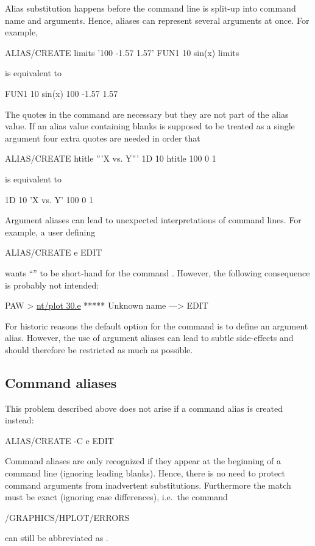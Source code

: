 Alias substitution happens before the command line is split-up into
command name and arguments.
Hence, aliases can represent several arguments at once.
For example,
\begin{XMP}
ALIAS/CREATE limits '100 -1.57 1.57'
FUN1 10 sin(x) limits
\end{XMP}
is equivalent to
\begin{XMP}
FUN1 10 sin(x) 100 -1.57 1.57
\end{XMP}
The quotes in the  command are necessary but they are
not part of the alias value.
If an alias value containing blanks is supposed to be treated as a
single argument four extra quotes are needed in order that
\begin{XMP}
ALIAS/CREATE htitle '''X vs. Y'''
1D 10 htitle 100 0 1
\end{XMP}
is equivalent to
\begin{XMP}
1D 10 'X vs. Y' 100 0 1
\end{XMP}

Argument aliases can lead to unexpected interpretations of command lines.
For example, a user defining
\begin{XMP}
ALIAS/CREATE e EDIT
\end{XMP}
wants ``'' to be short-hand for the command .
However, the following consequence is probably not intended:
\begin{XMP} 
PAW > \underline{nt/plot 30.e}
\vspace{-.8\baselineskip}
 ***** Unknown name ---> EDIT
\end{XMP}

For historic reasons the default option for the 
command is to define an argument alias.
However, the use of argument aliases can lead to subtle side-effects and
should therefore be restricted as much as possible. 


\subsection{Command aliases}

This problem described above does not arise if a command alias is
created instead: 
\begin{XMP}
ALIAS/CREATE -C e EDIT
\end{XMP}
Command aliases are only recognized if they appear at the beginning of a
command line (ignoring leading blanks).
Hence, there is no need to protect command arguments from inadvertent
substitutions.
Furthermore the match must be exact (ignoring case differences), i.e.\
the command
\begin{XMP}
/GRAPHICS/HPLOT/ERRORS
\end{XMP}
can still be abbreviated as .

